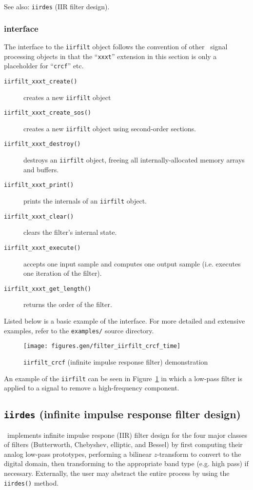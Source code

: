 See also: {\tt iirdes} (IIR filter design).

\subsubsection{interface}
\label{module:filter:iirfilt:interface}
The interface to the {\tt iirfilt} object follows the convention of other
\liquid\ signal processing objects in that the ``{\tt xxxt}'' extension in
this section is only a placeholder for ``{\tt crcf}'' etc.

\begin{description}
\item[{\tt iirfilt\_xxxt\_create()}]
    creates a new {\tt iirfilt} object
\item[{\tt iirfilt\_xxxt\_create\_sos()}]
    creates a new {\tt iirfilt} object using second-order sections.
\item[{\tt iirfilt\_xxxt\_destroy()}]
    destroys an {\tt iirfilt} object, freeing all internally-allocated memory
    arrays and buffers.
\item[{\tt iirfilt\_xxxt\_print()}]
    prints the internals of an {\tt iirfilt} object.
\item[{\tt iirfilt\_xxxt\_clear()}]
    clears the filter's internal state.
\item[{\tt iirfilt\_xxxt\_execute()}]
    accepts one input sample and computes one output sample (i.e. executes one
    iteration of the filter).
\item[{\tt iirfilt\_xxxt\_get\_length()}]
    returns the order of the filter.
\end{description}

Listed below is a basic example of the interface.
For more detailed and extensive examples, refer to the {\tt examples/}
source directory.

%
\begin{figure}
\centering
  \texttt{[image: figures.gen/filter\_iirfilt\_crcf\_time]}
\caption{{\tt iirfilt\_crcf} (infinite impulse response filter) demonstration}
\label{fig:module:filter:iirfilt_crcf}
\end{figure}
%
An example of the {\tt iirfilt} can be seen in
Figure~\ref{fig:module:filter:iirfilt_crcf}
in which a low-pass filter is applied to a signal to remove a
high-frequency component.


\subsection{{\tt iirdes} (infinite impulse response filter design)}
\label{module:filter:iirdes}
\liquid\ implements infinite impulse respone (IIR) filter design for the four
major classes of filters (Butterworth, Chebyshev, elliptic, and Bessel) by
first computing their analog low-pass prototypes, performing a bilinear
$z$-transform to convert to the digital domain, then transforming to the
appropriate band type (e.g. high pass) if necessary.
Externally, the user may abstract the entire process by using the
{\tt iirdes()} method.


